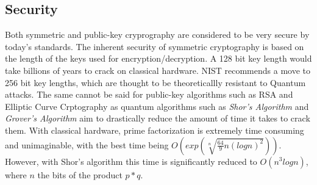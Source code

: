 \documentclass[journal]{IEEEtran}
\begin{document}
\subsection{Security}
Both symmetric and public-key cryprography are considered to be very secure by today's standards. The inherent security of symmetric cryptography is based on the length of the keys used for encryption/decryption. A 128 bit key length would take billions of years
to crack on classical hardware. NIST recommends a move to 256 bit key lengths, which are thought to be theoreticallly resistant to Quantum attacks. The same cannot be said for public-key algorithms such as RSA and Elliptic Curve 
Crptography as quantum algorithms such as \emph{Shor's Algorithm} and \emph{Grover's Algorithm} aim to drastically reduce the amount of time it takes to crack them. With classical hardware, prime factorization is extremely time consuming and
unimaginable, with the best time being $O(exp(\sqrt[n]{\frac{64}{9}n(logn)^2}))$. However, with Shor's algorithm this time is significantly reduced to $O(n^3logn)$, where $n$ the bits of the product $p*q$.
\end{document}

